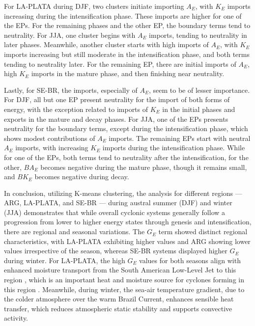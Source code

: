 For LA-PLATA during DJF, two clusters initiate importing $A_E$, with $K_E$ imports increasing during the intensification phase. These imports are higher for one of the EPs. For the remaining phases and the other EP, the boundary terms tend to neutrality. For JJA, one cluster begins with $A_E$ imports, tending to neutrality in later phases. Meanwhile, another cluster starts with high imports of $A_E$, with $K_E$ imports increasing but still moderate in the intensification phase, and both terms tending to neutrality later. For the remaining EP, there are initial imports of $A_E$, high $K_E$ imports in the mature phase, and then finishing near neutrality.

Lastly, for SE-BR, the imports, especially of $A_E$, seem to be of lesser importance. For DJF, all but one EP present neutrality for the import of both forms of energy, with the exception related to imports of $K_E$ in the initial phases and exports in the mature and decay phases. For JJA, one of the EPs presents neutrality for the boundary terms, except during the intensification phase, which shows modest contributions of $A_E$ imports. The remaining EPs start with neutral $A_E$ imports, with increasing $K_E$ imports during the intensification phase. While for one of the EPs, both terms tend to neutrality after the intensification, for the other, $BA_E$ becomes negative during the mature phase, though it remains small, and $BK_E$ becomes negative during decay.

In conclusion, utilizing K-means clustering, the analysis for different regions — ARG, LA-PLATA, and SE-BR — during austral summer (DJF) and winter (JJA) demonstrates that while overall cyclonic systems generally follow a progression from lower to higher energy states through genesis and intensification, there are regional and seasonal variations. The $G_E$ term showed distinct regional characteristics, with LA-PLATA exhibiting higher values and ARG showing lower values irrespective of the season, whereas SE-BR systems displayed higher $G_E$ during winter. For LA-PLATA, the high $G_E$ values for both seasons align with enhanced moisture transport from the South American Low-Level Jet to this region \citep{marengo2004climatology,drumond2008lagrangian}, which is an important heat and moisture source for cyclones forming in this region \citep{gramcianinov2019properties}. Meanwhile, during winter, the sea-air temperature gradient, due to the colder atmosphere over the warm Brazil Current, enhances sensible heat transfer, which reduces atmospheric static stability and supports convective activity.

